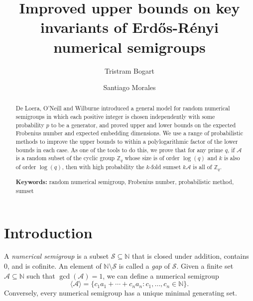 \documentclass[11pt]{amsart}
\theoremstyle{definition}
\theoremstyle{remark}
\def\NN{\ensuremath{\mathbb{N}}}
\def\ZZ{\ensuremath{\mathbb{Z}}}
\def\cA{\ensuremath{\mathcal{A}}}
\def\nsg{\ensuremath{\mathcal{S}}}
\begin{document}

\title[Improved upper bounds on key invariants]{Improved upper bounds on key invariants of Erd\H{o}s-R\'enyi numerical semigroups}

\author[Bogart]{Tristram Bogart}
\address{Departamento de Matem\'aticas \\ Universidad de los Andes \\ Bogot\'a, Colombia}


\author[Morales]{Santiago Morales}
\address{Graduate Group in Applied Mathematics \\ University of California, Davis  \\ Davis, California, USA}

\begin{abstract}
  De Loera, O'Neill and Wilburne introduced a general model for random numerical semigroups in which each positive integer is chosen independently with some probability $p$ to be a generator, and proved upper and lower bounds on the expected Frobenius number and expected embedding dimensions. We use a range of probabilistic methods to improve the upper bounds to within a polylogarithmic factor of the lower bounds in each case. As one of the tools to do this, we prove that for any prime $q$, if $\cA$ is a random subset of the cyclic group $\ZZ_q$ whose size is of order $\log(q)$ and $k$ is also of order $\log(q)$, then with high probability the $k$-fold sumset $k\cA$ is all of $\ZZ_q$.

   \smallskip
\noindent \textbf{Keywords:} random numerical semigroup, Frobenius number, probabilistic method, sumset  
\end{abstract}

\maketitle

\section{Introduction}
A \textit{numerical semigroup} is a subset $\nsg \subseteq \NN$ that is closed under addition, contains 0, and is cofinite. An element of $\NN \setminus \nsg$ is called a \emph{gap} of $\nsg$. Given a finite set $\cA \subseteq \NN$ such that $\gcd(\cA) = 1$, we can define a numerical semigroup
\[ \langle \cA \rangle = \{c_1a_1 + \cdots + c_na_n : c_1, \ldots, c_n \in \NN\}.\]
Conversely, every numerical semigroup has a unique minimal generating set.
\end{document}
